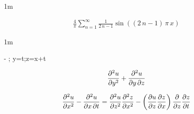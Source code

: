 \documentclass["AM3C-tests_resolutions.tex"]{subfiles}
\begin{document}
\begin{questionBox}1m{} %
  \answer{}
  \begin{tcolorbox}
    \begin{gather*}
      \frac{4}{\pi}\sum_{n=1}^{\infty}{
        \frac{1}{2\,n-1}
        \sin((2\,n-1)\,\pi\,x)
      }
    \end{gather*}
  \end{tcolorbox}
\end{questionBox}

\begin{questionBox}1m{} %
  \begin{BM}
    - 
    ; y=t;z=x+t
  \end{BM}
  \answer{}
  \begin{tcolorbox}
    \begin{gather*}
      \pdv[2]{u}{y}
      +\pdv{u}{y,z}
    \end{gather*}
  \end{tcolorbox}

  \begin{tcolorbox}
    \begin{gather*}
      \pdv[2]{u}{x}
      - \pdv{u}{x,t}
      =
      \pdv[2]{u}{z}
      \pdv[2]{z}{x}
      - \left(
        \pdv{u}{z}
        \pdv{z}{x}
      \right)
      \pdv{}{z}
      \pdv{z}{t}
    \end{gather*}
  \end{tcolorbox}
\end{questionBox}

\group{}
\end{document}

